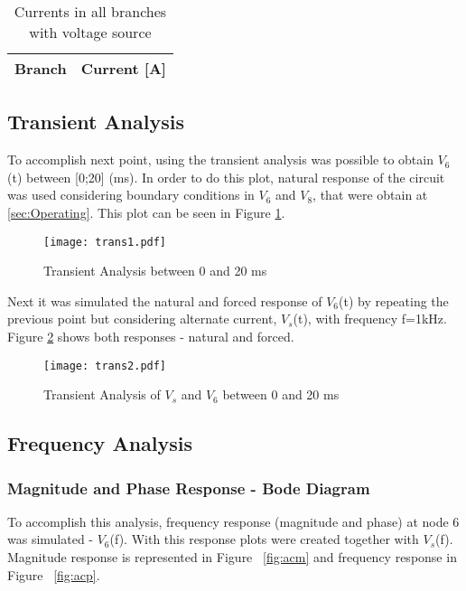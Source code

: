 \begin{table}[h]
  \centering
  \begin{tabular}{|l|r|}
    \hline    
    {\bf Branch} & {\bf Current [A]} \\ \hline
    
  \end{tabular}
  \caption{Currents in all branches with voltage source}
  \label{tab:op_amp2_tab}
\end{table}




\newpage
\subsection{Transient Analysis}

To accomplish next point, using the transient analysis was possible to obtain $V_6$(t) between [0;20] (ms). In order to do this plot, natural response of the circuit was used considering boundary conditions in $V_6$ and $V_8$, that were obtain at \ref{sec:Operating}. This plot can be seen in Figure \ref{fig:trans1}.

\begin{figure}[h] \centering
\texttt{[image: trans1.pdf]}
\caption{Transient Analysis between 0 and 20 ms}
\label{fig:trans1}
\end{figure}


Next it was simulated the natural and forced response of $V_6$(t) by repeating the previous point but considering alternate current, $V_s$(t), with frequency f=1kHz.
Figure \ref{fig:trans2} shows both responses - natural and forced.

\begin{figure}[h] \centering
\texttt{[image: trans2.pdf]}
\caption{Transient Analysis of $V_s$ and $V_6$ between 0 and 20 ms}
\label{fig:trans2}
\end{figure}


\newpage
\subsection{Frequency Analysis}

\subsubsection{Magnitude and Phase Response - Bode Diagram}

To accomplish this analysis, frequency response (magnitude and phase) at node 6 was simulated - $V_6$(f). With this response plots were created together with $V_s$(f).  Magnitude response is represented in Figure ~\ref{fig:acm} and frequency response in Figure ~\ref{fig:acp}.

